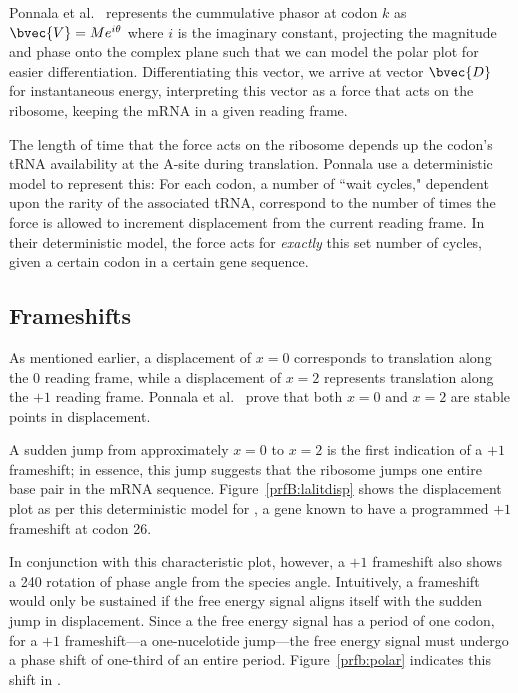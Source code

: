 \documentclass[12pt, draft]{article}
\numberwithin{equation}{section}
\begin{document}
Ponnala et al.~\cite{lalit:embs} represents the cummulative phasor at codon $k$ as $\bvec{V} = Me^{i\theta}$
where $i$ is the imaginary constant, projecting the magnitude and phase onto the complex plane such that
we can model the polar plot for easier differentiation.
Differentiating this vector, we arrive at vector $\bvec{D}$ for instantaneous energy, interpreting this
vector as a force that acts on the ribosome, keeping the mRNA in a given reading frame.

The length of time that the force acts on the ribosome depends up the codon's tRNA availability at the A-site during translation.
Ponnala use a deterministic model to represent this: For each codon, a number
of ``wait cycles," dependent upon the rarity of the associated tRNA, correspond to the number
of times the force is allowed to increment displacement from the current reading frame.
In their deterministic model, the force acts for \emph{exactly} this set number of cycles, given a certain codon in a certain gene sequence.

\subsection{Frameshifts}


As mentioned earlier, a displacement of $x = 0$ corresponds to translation along the 0 reading frame,
while a displacement of $x = 2$ represents translation along the $+1$ reading frame.
Ponnala et al.~\cite{lalit:embs} prove that both $x = 0$ and $x = 2$ are stable points in displacement.

A sudden jump from approximately $x = 0$ to $x = 2$ is the first indication of a $+1$ frameshift; 
in essence, this jump suggests that the ribosome jumps one entire base pair in the mRNA sequence.
Figure~\ref{prfB:lalitdisp} shows the displacement plot as per this deterministic model for \prfB, 
a gene known to have a programmed $+1$ frameshift at codon 26.

In conjunction with this characteristic plot, however, a $+1$ frameshift also shows a 240\degree
rotation of phase angle from the species angle.
Intuitively, a frameshift would only be sustained if the free energy signal aligns itself with the sudden jump in displacement.
Since a the free energy signal has a period of one codon, for a $+1$ frameshift---a one-nucelotide jump---the free energy signal
must undergo a phase shift of one-third of an entire period.  Figure~\ref{prfb:polar} indicates this shift in \prfB.
\end{document}
